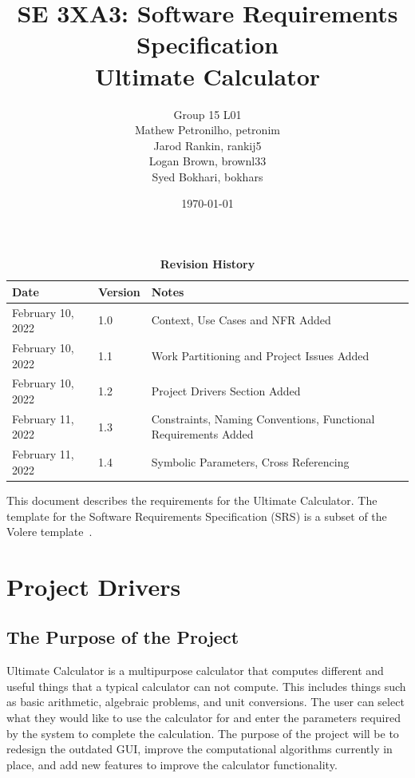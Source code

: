 \documentclass[12pt, titlepage]{article}
\title{SE 3XA3: Software Requirements Specification\\Ultimate Calculator}
\author{Group 15 L01
    \\ Mathew Petronilho, petronim
    \\ Jarod Rankin, rankij5
    \\ Logan Brown, brownl33
    \\ Syed Bokhari, bokhars
}
\date{\today}
\begin{document}
\maketitle

\tableofcontents
\listoftables
\listoffigures

\begin{table}[H]
\caption{\bf Revision History}
\begin{tabularx}{\textwidth}{p{3cm}p{2cm}X}
\toprule {\bf Date} & {\bf Version} & {\bf Notes}\\
\midrule
February 10, 2022 & 1.0 & Context, Use Cases and NFR Added\\
February 10, 2022 & 1.1 & Work Partitioning and Project Issues Added\\
February 10, 2022 & 1.2 & Project Drivers Section Added\\
February 11, 2022 & 1.3 & Constraints, Naming Conventions, Functional Requirements Added\\
February 11, 2022 & 1.4 & Symbolic Parameters, Cross Referencing\\
\bottomrule
\end{tabularx}
\end{table}

\newpage


This document describes the requirements for the Ultimate Calculator. The template for the Software
Requirements Specification (SRS) is a subset of the Volere
template~\citep{RobertsonAndRobertson2012}.

\section{Project Drivers}

\subsection{The Purpose of the Project}
Ultimate Calculator is a multipurpose calculator that computes different and useful things that a typical calculator can not compute. This includes things such as basic arithmetic, algebraic problems, and unit conversions. The user can select what they would like to use the calculator for and enter the parameters required by the system to complete the calculation. The purpose of the project will be to redesign the outdated GUI, improve the computational algorithms currently in place, and add new features to improve the calculator functionality.
\end{document}

